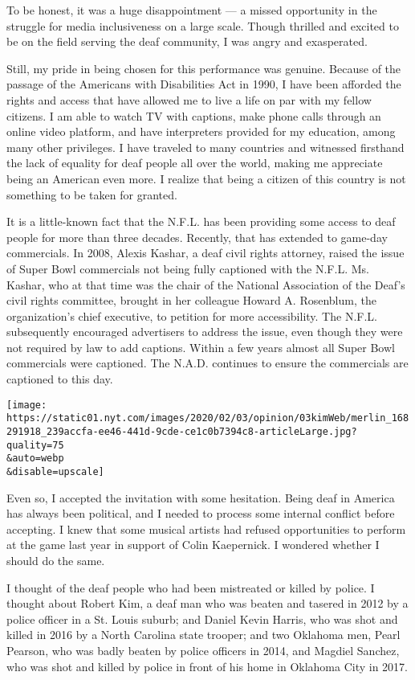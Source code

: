 To be honest, it was a huge disappointment --- a missed opportunity in
the struggle for media inclusiveness on a large scale. Though thrilled
and excited to be on the field serving the deaf community, I was angry
and exasperated.

Still, my pride in being chosen for this performance was genuine.
Because of the passage of the Americans with Disabilities Act in 1990, I
have been afforded the rights and access that have allowed me to live a
life on par with my fellow citizens. I am able to watch TV with
captions, make phone calls through an online video platform, and have
interpreters provided for my education, among many other privileges. I
have traveled to many countries and witnessed firsthand the lack of
equality for deaf people all over the world, making me appreciate being
an American even more. I realize that being a citizen of this country is
not something to be taken for granted.

It is a little-known fact that the N.F.L. has been providing some access
to deaf people for more than three decades. Recently, that has extended
to game-day commercials. In 2008, Alexis Kashar, a deaf civil rights
attorney, raised the issue of Super Bowl commercials not being fully
captioned with the N.F.L. Ms. Kashar, who at that time was the chair of
the National Association of the Deaf's civil rights committee, brought
in her colleague Howard A. Rosenblum, the organization's chief
executive, to petition for more accessibility. The N.F.L. subsequently
encouraged advertisers to address the issue, even though they were not
required by law to add captions. Within a few years almost all Super
Bowl commercials were captioned. The N.A.D. continues to ensure the
commercials are captioned to this day.

\texttt{[image: https://static01.nyt.com/images/2020/02/03/opinion/03kimWeb/merlin\_168291918\_239accfa-ee46-441d-9cde-ce1c0b7394c8-articleLarge.jpg?quality=75\\\&auto=webp\\\&disable=upscale]}

Even so, I accepted the invitation with some hesitation. Being deaf in
America has always been political, and I needed to process some internal
conflict before accepting. I knew that some musical artists had refused
opportunities to perform at the game last year in support of Colin
Kaepernick. I wondered whether I should do the same.

I thought of the deaf people who had been mistreated or killed by
police. I thought about Robert Kim, a deaf man who was beaten and
tasered in 2012 by a police officer in a St. Louis suburb; and Daniel
Kevin Harris, who was shot and killed in 2016 by a North Carolina state
trooper; and two Oklahoma men, Pearl Pearson, who was badly beaten by
police officers in 2014, and Magdiel Sanchez, who was shot and killed by
police in front of his home in Oklahoma City in 2017.

